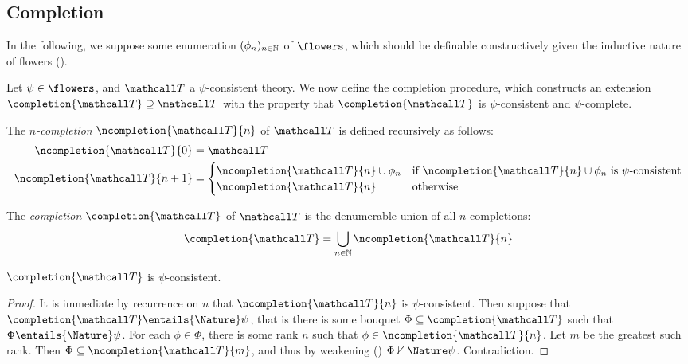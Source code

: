 \begin{scope}

\subsection{Completion}

In the following, we suppose some enumeration $(\phi_n)_{n \in \mathbb{N}}$ of
$\flowers$, which should be definable constructively given the
inductive nature of flowers ().

Let $\psi \in \flowers$, and $\tT$ a $\psi$-consistent theory. We now define the
completion procedure, which constructs an extension $\completion{\tT} \supseteq
\tT$ with the property that $\completion{\tT}$ is $\psi$-consistent and
$\psi$-complete.

\begin{definition}[$n$-completion]
  The \emph{$n$-completion} $\ncompletion{\tT}{n}$ of $\tT$ is defined recursively
  as follows:
  \begin{align*}
    \ncompletion{\tT}{0} &= \tT \\
    \ncompletion{\tT}{n+1} &=
    \begin{cases}
      \ncompletion{\tT}{n} \cup \phi_n &\text{if $\ncompletion{\tT}{n} \cup \phi_n$ is $\psi$-consistent} \\
      \ncompletion{\tT}{n} &\text{otherwise}
    \end{cases}
  \end{align*}
\end{definition}

\begin{definition}[Completion]
  The \emph{completion} $\completion{\tT}$ of $\tT$ is the denumerable union of all
  $n$-completions:
  $$\completion{\tT} = \bigcup_{n \in \nats}{\ncompletion{\tT}{n}}$$
\end{definition}

\begin{lemma}
  $\completion{\tT}$ is $\psi$-consistent.
\end{lemma}
\begin{proof}
  It is immediate by recurrence on $n$ that $\ncompletion{\tT}{n}$ is
  $\psi$-consistent. Then suppose that $\completion{\tT} \entails{\Nature} \psi$,
  that is there is some bouquet $\Phi \subseteq \completion{\tT}$ such that $\Phi
  \entails{\Nature} \psi$. For each $\phi \in \Phi$, there is some rank $n$ such
  that $\phi \in \ncompletion{\tT}{n}$. Let $m$ be the greatest such rank. Then
  $\Phi \subseteq \ncompletion{\tT}{m}$, and thus by weakening
  () $\Phi \nvdash{\Nature} \psi$. Contradiction.
\end{proof}



\end{scope}
